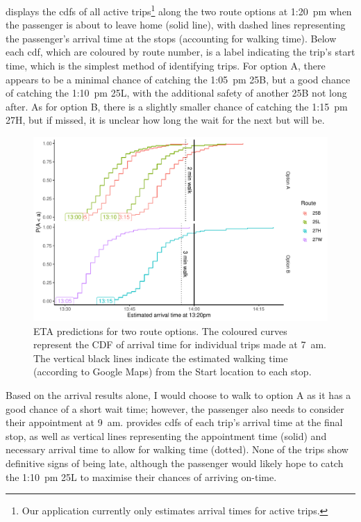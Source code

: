  displays the \glspl{cdf} of all active trips\footnote{Our application currently only estimates arrival times for active trips.} along the two route options at  1:20~pm when the passenger is about to leave home (solid line), with dashed lines representing the passenger's arrival time at the stops (accounting for walking time). Below each \gls{cdf}, which are coloured by route number, is a label indicating the trip's start time, which is the simplest method of identifying trips. For option A, there appears to be a minimal chance of catching the 1:05~pm 25B, but a good chance of catching the 1:10~pm 25L, with the additional safety of another 25B not long after. As for option B, there is a slightly smaller chance of catching the 1:15~pm 27H, but if missed, it is unclear how long the wait for the next but will be.


\begin{knitrout}\small
{}\color{fgcolor}\begin{figure}

{\centering \includegraphics[width=\textwidth]{figure/eta_journey_arriveby-1} 

}

\caption[ETA predictions for two route options]{ETA predictions for two route options. The coloured curves represent the CDF of arrival time for individual trips made at 7~am. The vertical black lines indicate the estimated walking time (according to Google Maps) from the Start location to each stop.}\label{fig:eta_journey_arriveby}
\end{figure}


\end{knitrout}

Based on the arrival results alone, I would choose to walk to option A as it has a good chance of a short wait time; however, the passenger also needs to consider their appointment at 9~am.  provides \glspl{cdf} of each trip's arrival time at the final stop, as well as vertical lines representing the appointment time (solid) and necessary arrival time to allow for walking time (dotted). None of the trips show definitive signs of being late, although the passenger would likely hope to catch the 1:10~pm 25L to maximise their chances of arriving on-time.


